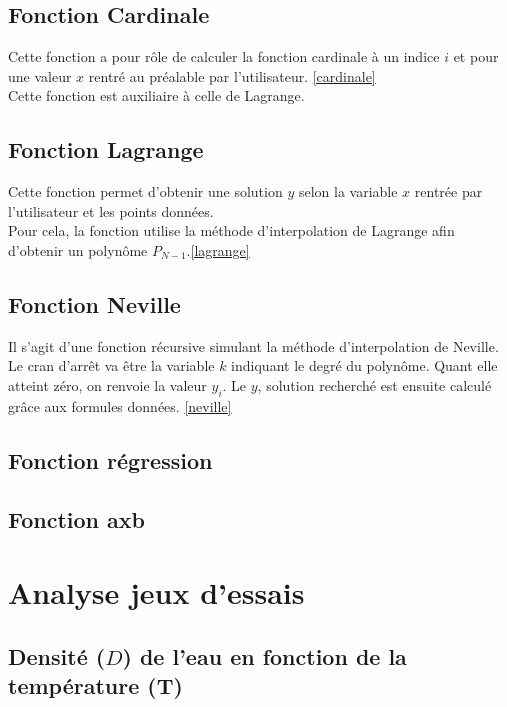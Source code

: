 \documentclass[12pt,french,titlepage]{article}
\begin{document}
	\subsection{Fonction Cardinale}
	
	
	\medskip
	Cette fonction a pour rôle de calculer la fonction cardinale à un indice $i$ et pour une valeur $x$ rentré au préalable par l'utilisateur. \ref{cardinale} \\
	Cette fonction est auxiliaire à celle de Lagrange.\\
	\subsection{Fonction Lagrange}
	
	
	\medskip
	Cette fonction permet d'obtenir une solution $y$ selon la variable $x$ rentrée par l'utilisateur et les points données.\\
	Pour cela, la fonction utilise la méthode d'interpolation de Lagrange afin d'obtenir un polynôme $P_{N-1}$.\ref{lagrange}
	\subsection{Fonction Neville}
	
	\medskip
	Il s'agit d'une fonction récursive simulant la méthode d'interpolation de Neville. Le cran d'arrêt va être la variable $k$ indiquant le degré du polynôme. Quant elle atteint zéro, on renvoie la valeur $y_i$. Le $y$, solution recherché est ensuite calculé grâce aux formules données. \ref{neville}
	\subsection{Fonction régression}
	
	\subsection{Fonction axb}
	
	\section{Analyse jeux d'essais}
	
	\subsection{Densité ($D$) de l'eau en fonction de la température (T)}
	
\end{document}
